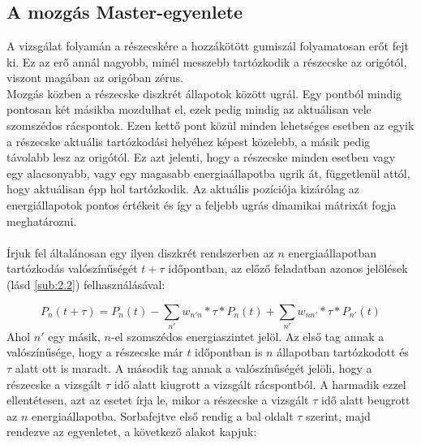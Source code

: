 \section{} \label{sec:3}

\subsection{A mozgás Master-egyenlete} \label{sub:3.1}
A vizsgálat folyamán a részecskére a hozzákötött gumiszál folyamatosan erőt fejt ki. Ez az erő annál nagyobb, minél messzebb tartózkodik a részecske az origótól, viszont magában az origóban zérus. \\
Mozgás közben a részecske diszkrét állapotok között ugrál. Egy pontból mindig pontosan két másikba mozdulhat el, ezek pedig mindig az aktuálisan vele szomszédos rácspontok. Ezen kettő pont közül minden lehetséges esetben az egyik a részecske aktuális tartózkodási helyéhez képest közelebb, a másik pedig távolabb lesz az origótól. Ez azt jelenti, hogy a részecske minden esetben vagy egy alacsonyabb, vagy egy magasabb energiaállapotba ugrik át, függetlenül attól, hogy aktuálisan épp hol tartózkodik. Az aktuális pozíciója kizárólag az energiállapotok pontos értékeit és így a feljebb ugrás dinamikai mátrixát fogja meghatározni.
\\ \\
Írjuk fel általánosan egy ilyen diszkrét rendszerben az $n$ energiaállapotban tartózkodás valószínűségét $t + \tau$ időpontban, az előző feladatban azonos jelölések (lásd \ref{sub:2.2}) felhasználásával:

\begin{equation}
    P_{n} \left( t + \tau \right)
    =
    P_{n} \left( t \right)
    -
    \sum_{n'} w_{n'n} * \tau * P_{n} \left( t \right)
    +
    \sum_{n'} w_{nn'} * \tau * P_{n'} \left( t \right)
\end{equation}
Ahol $n'$ egy másik, $n$-el szomszédos energiaszintet jelöl. Az első tag annak a valószínűsége, hogy a részecske már $t$ időpontban is $n$ állapotban tartózkodott és $\tau$ alatt ott is maradt. A második tag annak a valószínűségét jelöli, hogy a részecske a vizsgált $\tau$ idő alatt kiugrott a vizsgált rácspontból. A harmadik ezzel ellentétesen, azt az esetet írja le, mikor a részecske a vizsgált $\tau$ idő alatt beugrott az $n$ energiaállapotba. Sorbafejtve első rendig a bal oldalt $\tau$ szerint, majd rendezve az egyenletet, a következő alakot kapjuk:
 
